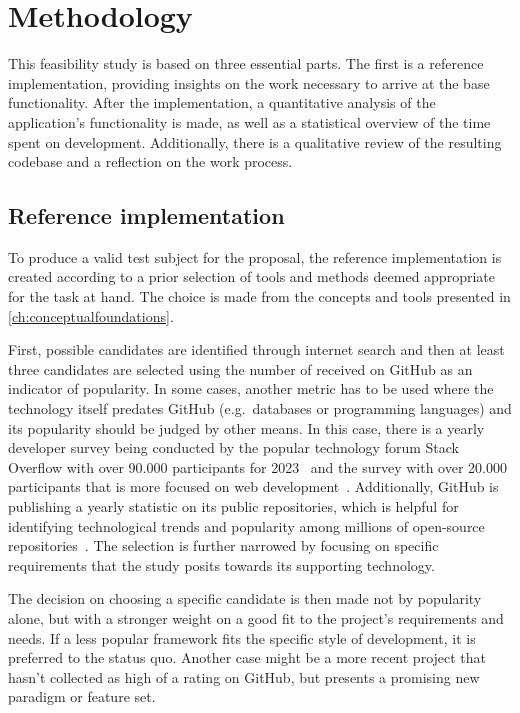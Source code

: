 \chapter{Methodology}
\label{ch:methodology}

This feasibility study is based on three essential parts.
The first is a reference implementation, providing insights on the work necessary to arrive at the base functionality.
After the implementation, a quantitative analysis of the application's functionality is made, as well as a statistical overview of the time spent on development.
Additionally, there is a qualitative review of the resulting codebase and a reflection on the work process.


\section{Reference implementation}
\label{sec:reference-implementation}

To produce a valid test subject for the proposal, the reference implementation is created according to a prior selection of tools and methods deemed appropriate for the task at hand.
The choice is made from the concepts and tools presented in \autoref{ch:conceptualfoundations}.

First, possible candidates are identified through internet search and then at least three candidates are selected using the number of  received on GitHub as an indicator of popularity.
In some cases, another metric has to be used where the technology itself predates GitHub (e.g.\ databases or programming languages) and its popularity should be judged by other means.
In this case, there is a yearly developer survey being conducted by the popular technology forum Stack Overflow with over 90.000 participants for 2023~\parencite{stackOverflowPoll} and the  survey with over 20.000 participants that is more focused on web development~\parencite{stateOfJSSurvey}.
Additionally, GitHub is publishing a yearly statistic on its public repositories, which is helpful for identifying technological trends and popularity among millions of open-source repositories~\parencite{stateOfTheOctoverse23}.
The selection is further narrowed by focusing on specific requirements that the study posits towards its supporting technology.

The decision on choosing a specific candidate is then made not by popularity alone, but with a stronger weight on a good fit to the project's requirements and needs.
If a less popular framework fits the specific style of development, it is preferred to the status quo.
Another case might be a more recent project that hasn't collected as high of a rating on GitHub, but presents a promising new paradigm or feature set.

